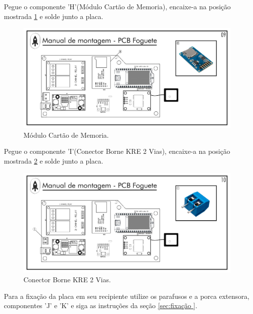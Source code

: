 \par Pegue o componente 'H'(Módulo Cartão de Memoria), encaixe-a na posição mostrada \ref{fig:PCIFoguete MICRO SD CARD} e solde junto a placa.
\begin{figure}[H]
  \centering
  \includegraphics[width=\textwidth]{Figuras/FOGUETE/Pg-09---PL-02.png}
  \caption{Módulo Cartão de Memoria.}
  \label{fig:PCIFoguete MICRO SD CARD}
\end{figure}

\newpage

\par Pegue o componente 'I'(Conector Borne KRE 2 Vias), encaixe-a na posição mostrada \ref{fig:PCIFoguete Borne} e solde junto a placa.
\begin{figure}[H]
  \centering
  \includegraphics[width=\textwidth]{Figuras/FOGUETE/Pg-10---PL-02.png}
  \caption{Conector Borne KRE 2 Vias.}
  \label{fig:PCIFoguete Borne}
\end{figure}
\par Para a fixação da placa em seu recipiente utilize os parafusos e a porca extensora, componentes 'J' e 'K' e siga as instruções da seção \ref{sec:fixação }.

\newpage

